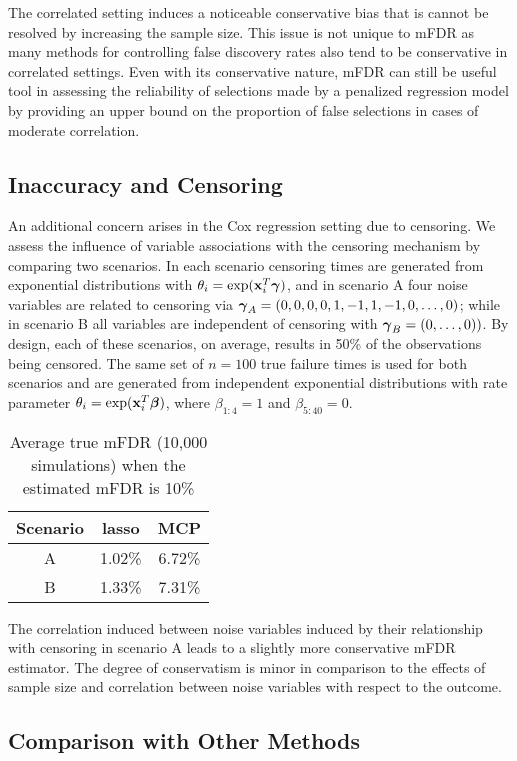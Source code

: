 The correlated setting induces a noticeable conservative bias that is cannot be resolved by increasing the sample size. This issue is not unique to mFDR as many methods for controlling false discovery rates also tend to be conservative in correlated settings. Even with its conservative nature, mFDR can still be useful tool in assessing the reliability of selections made by a penalized regression model by providing an upper bound on the proportion of false selections in cases of moderate correlation.

\subsection{Inaccuracy and Censoring}

An additional concern arises in the Cox regression setting due to censoring.  We assess the influence of variable associations with the censoring mechanism by comparing two scenarios. In each scenario censoring times are generated from exponential distributions with $\theta_{i} = \exp(\mathbf{x}_i^T \boldsymbol{\gamma})$, and in scenario A four noise variables are related to censoring via $\boldsymbol{\gamma}_A = (0, 0, 0, 0, 1, -1, 1, -1, 0, \ldots, 0) $; while in scenario B all variables are independent of censoring with $\boldsymbol{\gamma}_B = (0, \ldots, 0))$. By design, each of these scenarios, on average, results in 50\% of the observations being censored.  The same set of $n = 100$ true failure times is used for both scenarios and are generated from independent exponential distributions with rate parameter $\theta_i = \exp(\mathbf{x}_i^T \boldsymbol{\beta})$, where $\beta_{1:4} = 1$ and $\beta_{5:40} = 0$.
\begin{table}[!htb]
 \caption{Average true mFDR (10,000 simulations) when the estimated mFDR is 10\%}
\centering
\begin{tabular}{c | c c}
  \hline
 Scenario & lasso & MCP   \\  [0.5ex]
  \hline 
   A & 1.02\% & 6.72\% \\ 
   B &  1.33\% & 7.31\% \\ 
   \hline
\end{tabular}
\end{table}

The correlation induced between noise variables induced by their relationship with censoring in scenario A leads to a slightly more conservative mFDR estimator. The degree of conservatism is minor in comparison to the effects of sample size and correlation between noise variables with respect to the outcome.

\subsection{Comparison with Other Methods}


